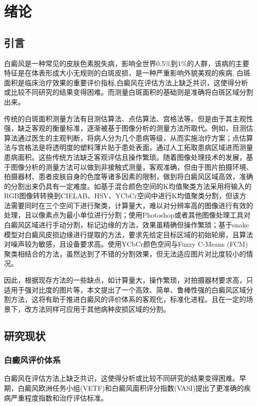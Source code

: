 \chapter{绪论}
\section{引言}
白癜风是一种常见的皮肤色素脱失病，影响全世界0.5\%到1\%的人群，该病的主要特征是在体表形成大小无规则的白斑皮损，是一种严重影响外貌美观的疾病, 白斑面积是临床治疗效果的重要评价指标,白癜风在评估方法上缺乏共识，这使得分析或比较不同研究的结果变得困难。而测量白斑面积的基础则是准确将白斑区域分割出来。

传统的白斑面积测量方法有目测估算法、点估算法、宫格法等\cite{林瑶2002医学图像分割方法综述}。但是由于其主观性强，缺乏客观的衡量标准，逐渐被基于图像分析的测量方法所取代。例如，目测估算法通过医生的主观判断，将病人分为几个患病等级，从而实施治疗方案；点估算法与宫格法是将透明度的塑料薄片贴于患处表面，通过人工拓取患病区域进而测量患病面积。这些传统方法缺乏客观评估且操作繁琐。随着图像处理技术的发展，基于图像分析的测量方法可以做到非接触式测量，客观准确，但由于图片拍摄环境、拍摄器材、患者皮肤自身的色度等诸多因素的限制，做到将白癜风区域高效，准确的分割出来仍具有一定难度。如基于混合颜色空间的K均值聚类方法\cite{2006数字图像处理}采用将输入的RGB图像转转换到CIELAB、HSV、YCbCr空间中进行K均值聚类分割，但该方法需要同时在三个空间下进行聚类，计算量大，难以对分辨率高的图像进行有效的处理，且以像素点为最小单位进行分割；使用Photoshop或者其他图像处理工具对白癜风区域进行手动分割，标记边缘的方法，效果虽精确但操作繁琐；基于snake模型对白癜风皮损边缘进行提取的方法，要求先给定目标区域的初始轮廓，且算法对噪声较为敏感，且设备要求高。使用YCbCr颜色空间与Fuzzy C-Means (FCM) 聚类相结合的方法，虽然达到了不错的分割效果，但无法适应图片对比度较小的情况。

因此，根据现存方法的一些缺点，如计算量大，操作繁琐，对拍摄器材要求高，只适用于强对比度的图片等，本文提出了一个高效、简单、鲁棒性强的白癜风区域分割方法，这将有助于推进白癜风的评价体系的客观化，标准化进程。且在一定的场景下，改方法同样可应用于其他病种皮损区域的分割。

\section{研究现状}
\subsection{白癜风评价体系}
白癜风在评估方法上缺乏共识，这使得分析或比较不同研究的结果变得困难。早期，白癜风欧洲任务小组(VETF)\cite{taieb2007definition}和白癜风面积评分指数(VASI)\cite{Iltefat2004Parametric}提出了更准确的疾病严重程度指数和治疗评估标准。

